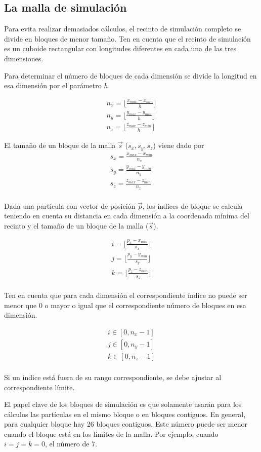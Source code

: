 \subsection{La malla de simulación}

Para evita realizar demasiados cálculos, el recinto de simulación completo se
divide en bloques de menor tamaño. Ten en cuenta que el recinto de simulación es
un cuboide rectangular con longitudes diferentes en cada una de las tres
dimensiones.

Para determinar el número de bloques de cada dimensión se divide la longitud en
esa dimensión por el parámetro $h$.

\[
\begin{split}
n_x = \lfloor \frac{x_{max}- x_{min}}{h} \rfloor\\
n_y = \lfloor \frac{y_{max}- y_{min}}{h} \rfloor\\
n_z = \lfloor \frac{z_{max}- z_{min}}{h} \rfloor
\end{split}
\]

El tamaño de un bloque de la malla $\vec{s}$ ($s_x, s_y, s_z$) viene dado por
\[
\begin{split}
s_x = \frac{x_{max} - x_{min}}{n_x}\\
s_y = \frac{y_{max} - y_{min}}{n_y}\\
s_z = \frac{z_{max} - z_{min}}{n_z}\\
\end{split}
\] 

Dada una partícula con vector de posición $\vec{p}$, los índices de bloque se
calcula teniendo en cuenta su distancia en cada dimensión a la coordenada mínima
del recinto y el tamaño de un bloque de la malla ($\vec{s}$).

\[
\begin{split}
i = \lfloor \frac{p_x - x_{min}}{s_x} \rfloor\\
j = \lfloor \frac{p_y - y_{min}}{s_y} \rfloor\\
k = \lfloor \frac{p_z - z_{min}}{s_z} \rfloor\\
\end{split}
\]

Ten en cuenta que para cada dimensión el correspondiente índice no puede ser
menor que $0$ o mayor o igual que el correspondiente número de bloques en esa
dimensión.

\[
\begin{split}
i \in [0, n_x-1]\\
j \in [0, n_y-1]\\
k \in [0, n_z-1]\\
\end{split}
\]

Si un índice está fuera de su rango correspondiente, se debe ajustar al
correspondiente límite.

El papel clave de los bloques de simulación es que solamente usarán para los
cálculos las partículas en el mismo bloque o en bloques contiguos. En general,
para cualquier bloque hay 26 bloques contiguos. Este número puede ser menor
cuando el bloque está en los límites de la malla. Por ejemplo, cuando $i=j=k=0$,
el número de 7.
